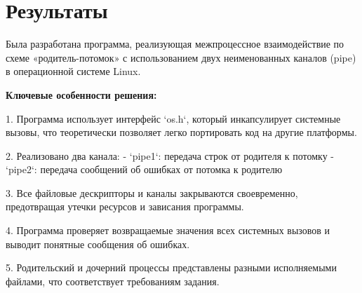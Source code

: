 \section{Результаты}

Была разработана программа, реализующая межпроцессное взаимодействие по схеме «родитель-потомок» с использованием двух неименованных каналов (pipe) в операционной системе Linux.

{\bfseries Ключевые особенности решения:}

1. Программа использует интерфейс `os.h`, который инкапсулирует системные вызовы, что теоретически позволяет легко портировать код на другие платформы.

2. Реализовано два канала:
   - `pipe1`: передача строк от родителя к потомку
   - `pipe2`: передача сообщений об ошибках от потомка к родителю

3. Все файловые дескрипторы и каналы закрываются своевременно, предотвращая утечки ресурсов и зависания программы.

4. Программа проверяет возвращаемые значения всех системных вызовов и выводит понятные сообщения об ошибках.

5. Родительский и дочерний процессы представлены разными исполняемыми файлами, что соответствует требованиям задания.